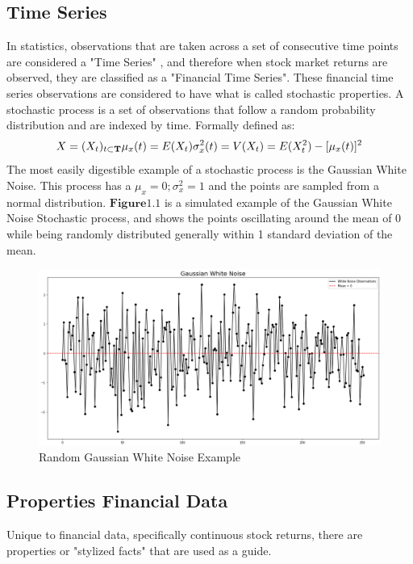 \subsection{Time Series}
In statistics, observations that are taken across a set of consecutive time points are considered a "Time Series" \cite{Popov2022}, and therefore when stock market returns are observed, they are classified as a "Financial Time Series". These financial time series observations are considered to have what is called stochastic properties. A stochastic process is a set of observations that follow a random probability distribution and are indexed by time. Formally defined as: $$
X =(X_t)_{t\subset\mathbf{T}}\\
\mu_x(t) = E(X_t) \\ \sigma^2_x(t) = V(X_t) = E(X^2_t)-[\mu_x(t)]^2
$$ The most easily digestible example of a stochastic process is the Gaussian White Noise. This process has a $\mu_x = 0; \sigma^2_x = 1$ and the points are sampled from a normal distribution. $\mathbf{Figure 1.1}$ is a simulated example of the Gaussian White Noise Stochastic process, and shows the points oscillating around the mean of 0 while being randomly distributed generally within 1 standard deviation of the mean. 

\begin{figure}[H]
\centering
\includegraphics[scale=0.35]{images/GaussianWN.png}
\caption{Random Gaussian White Noise Example}
\label{fig: Gaussian WN}
\end{figure}

\subsection{Properties Financial Data}
Unique to financial data, specifically continuous stock returns, there are properties or "stylized facts" \cite{Popov2022} that are used as a guide.   

